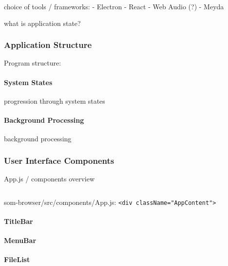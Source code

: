 choice of tools / frameworks:
- Electron
- React
- Web Audio (?)
- Meyda

what is application state?

\subsubsection{Application Structure}
\label{subsubsec:som-browser_structure}

Program structure:

\paragraph{System States}
\label{para:som-browser_states}
progression through system states

\paragraph{Background Processing}
\label{para:som-browser_background_processing}
background processing

\subsubsection{User Interface Components}
\label{subsubsec:som-browser_components}
App.js / components overview

\begin{listing}[!htb]
  \begin{mdframed}
    \inputminted[numbers=left, firstline=400, lastline=460,
    fontsize=\scriptsize]{jsx}{../dev/som-browser/src/components/App.js}
  \end{mdframed}
  \caption{som-browser/src/components/App.js:
  \texttt{<div className="AppContent">}}
  \label{lst:som-browser_app_content}
\end{listing}

\paragraph{TitleBar}
\label{para:title_bar}

\paragraph{MenuBar}
\label{para:menu_bar}

\paragraph{FileList}
\label{para:file_list}

